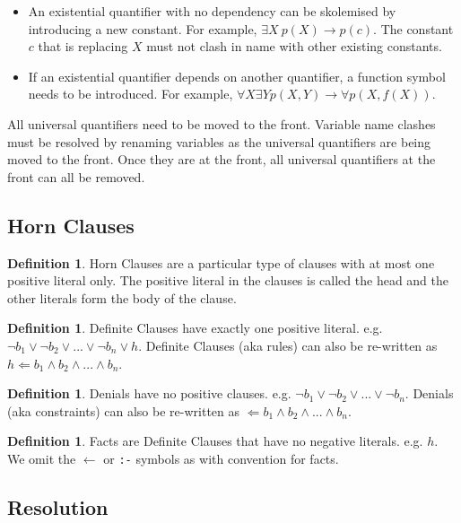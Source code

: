 \documentclass{article}
\theoremstyle{plain}
\theoremstyle{definition}
\newtheorem{defn}[thm]{Definition} %
\begin{document}
\begin{multicols}{2}
\begin{itemize}
\item An existential quantifier with no dependency can be skolemised by introducing a new constant. For example, $\exists X\ p(X) \longrightarrow p(c)$. The constant $c$ that is replacing $X$ must not clash in name with other existing constants.
\item If an existential quantifier depends on another quantifier, a function symbol needs to be introduced. For example, $\forall X \exists Y p(X, Y) \longrightarrow \forall p(X, f(X))$.
\end{itemize}

\noindent All universal quantifiers need to be moved to the front. Variable name clashes must be resolved by renaming variables as the universal quantifiers are being moved to the front. Once they are at the front, all universal quantifiers at the front can all be removed. 

\subsection{Horn Clauses}

\begin{defn}Horn Clauses are a particular type of clauses with at most one positive literal only. The positive literal in the clauses is called the head and the other literals form the body of the clause.\end{defn}

\begin{defn}Definite Clauses have exactly one positive literal.  e.g. $\lnot b_1 \lor\lnot b_2 \lor ... \lor\lnot b_n \lor h$. Definite Clauses (aka rules) can also be re-written as $h \Leftarrow b_1 \land b_2 \land ... \land b_n$.\end{defn}

\begin{defn}Denials have no positive clauses. e.g. $\lnot b_1 \lor\lnot b_2 \lor ... \lor\lnot b_n$. Denials (aka constraints) can also be re-written as $\Leftarrow b_1 \land b_2 \land ... \land b_n$.\end{defn}

\begin{defn}Facts are Definite Clauses that have no negative literals. e.g. $h$. We omit the $\leftarrow$  or \lstinline{:-} symbols as with convention for facts.\end{defn}

\subsection{Resolution}


\end{multicols}
\end{document}
